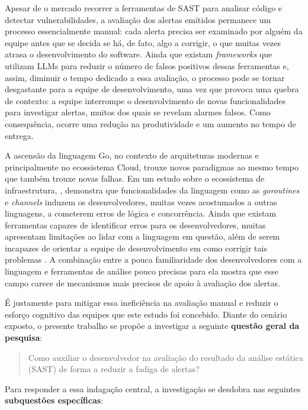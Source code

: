 Apesar de o mercado recorrer a ferramentas de SAST para analisar código e detectar vulnerabilidades, a avaliação dos alertas emitidos permanece um processo essencialmente manual: cada alerta precisa ser examinado por alguém da equipe antes que se decida se há, de fato, algo a corrigir, o que muitas vezes atrasa o desenvolvimento do software. Ainda que existam \textit{frameworks} que utilizam LLMs para reduzir o número de falsos positivos dessas ferramentas \cite{iranmanesh2025zerofalseimprovingprecisionstatic} e, assim, diminuir o tempo dedicado a essa avaliação, o processo pode se tornar desgastante para a equipe de desenvolvimento, uma vez que provoca uma quebra de contexto: a equipe interrompe o desenvolvimento de novas funcionalidades para investigar alertas, muitos dos quais se revelam alarmes falsos. Como consequência, ocorre uma redução na produtividade e um aumento no tempo de entrega.

A ascensão da linguagem Go, no contexto de arquiteturas modernas e principalmente no ecossistema Cloud, trouxe novos paradigmas ao mesmo tempo que também trouxe novas falhas. Em um estudo sobre o ecossistema de infraestrutura, , demonstra que funcionalidades da linguagem como as \textit{goroutines} e \textit{channels} induzem os desenvolvedores, muitas vezes acostumados a outras linguagens, a cometerem erros de lógica e concorrência. Ainda que existam ferramentas capazes de identificar erros para os desenvolvedores, muitas apresentam limitações ao lidar com a linguagem em questão, além de serem incapazes de orientar a equipe de desenvolvimento em como corrigir tais problemas \cite{wu2026}. A combinação entre a pouca familiaridade dos desenvolvedores com a linguagem e ferramentas de análise pouco precisas para ela mostra que esse campo carece de mecanismos mais precisos de apoio à avaliação dos alertas.

É justamente para mitigar essa ineficiência na avaliação manual e reduzir o esforço cognitivo das equipes que este estudo foi concebido. Diante do cenário exposto, o presente trabalho se propõe a investigar a seguinte \textbf{questão geral da pesquisa}:

\begin{quote}
Como auxiliar o desenvolvedor na avaliação do resultado da análise estática (SAST) de forma a reduzir a fadiga de alertas?
\end{quote}

Para responder a essa indagação central, a investigação se desdobra nas seguintes \textbf{subquestões específicas}:

